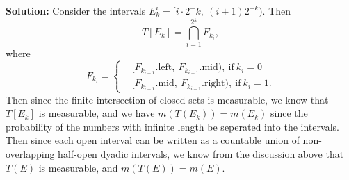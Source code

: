 \documentclass{article}%
\begin{document}
\begin{enumerate}
\textbf{Solution:}
Consider the intervals $E_k^i = [i\cdot2^-{k}, ~(i+1)2^{-k})$. Then
$$
T[E_k] = \bigcap_{i=1}^{2^k}F_{k_i},
$$
where 
$$
F_{k_i} = \left\{
\begin{aligned}
&[F_{k_{i-1}}.\text{left}, ~F_{k_{i-1}}.\text{mid}), ~\text{if}~ k_i = 0 \\
&[F_{k_{i-1}}.\text{mid}, ~F_{k_{i-1}}.\text{right}), ~\text{if}~ k_i = 1.
\end{aligned}
\right.
$$
Then since the finite intersection of closed sets is measurable, we know that $T[E_k]$ is measurable, and we have $m(T(E_k)) = m(E_k)$ since the probability of the numbers with infinite length be seperated into the intervals. Then since each open interval can be written as a countable union of non-overlapping half-open dyadic intervals, we know from the discussion above that $T(E)$ is measurable, and $m(T(E)) = m(E)$.

\bigskip


\end{enumerate}
\end{document}
